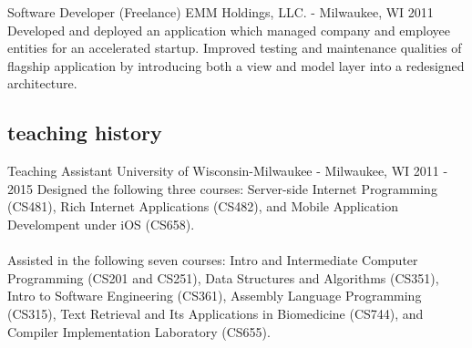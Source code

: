 \documentclass[]{fritz-resume}
\begin{document}
\entry
  {Software Developer (Freelance)}
  {EMM Holdings, LLC. - Milwaukee, WI}
  {2011}
  {
    Developed and deployed an application which managed company and employee entities for an accelerated startup. Improved testing and maintenance qualities of flagship application by introducing both a view and model layer into a redesigned architecture.
  }

\subsection{teaching history}

\entry
  {Teaching Assistant}
  {University of Wisconsin-Milwaukee - Milwaukee, WI}
  {2011 - 2015}
  {
    Designed the following three courses: Server-side Internet Programming (CS481), Rich Internet Applications (CS482), and Mobile Application Develompent under iOS (CS658). \\\\ Assisted in the following seven courses: Intro and Intermediate Computer Programming (CS201 and CS251), Data Structures and Algorithms (CS351), Intro to Software Engineering (CS361), Assembly Language Programming (CS315), Text Retrieval and Its Applications in Biomedicine (CS744), and Compiler Implementation Laboratory (CS655).
  }
\end{document}

